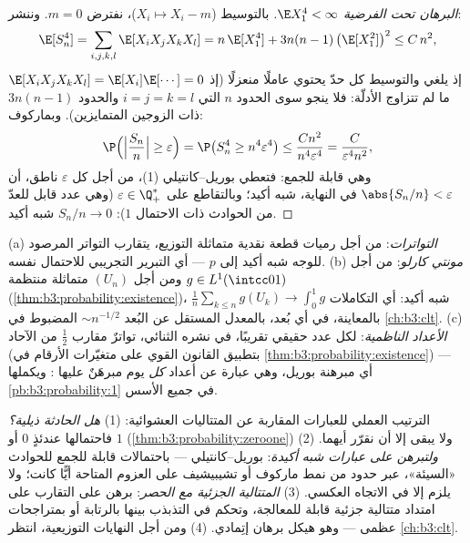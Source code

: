 \begin{proof}[البرهان تحت الفرضية $\E X_1^4 < \infty$]
بالتوسيط ($X_i \mapsto X_i - m$)، نفترض $m = 0$. وننشر:
\[
\E[S_n^4] = \sum_{i,j,k,l}\E[X_iX_jX_kX_l]
= n\,\E[X_1^4] + 3n(n-1)\,\bigl(\E[X_1^2]\bigr)^2 \leq
C\,n^2 ,
\]
إذ يلغي  والتوسيط كل حدّ يحتوي عاملًا منعزلًا (إذ
$\E[X_iX_jX_kX_l] =
\E[X_i]\E[\cdots] = 0$ ما لم تتزاوج الأدلّة: فلا ينجو سوى الحدود $n$ التي
$i=j=k=l$ والحدود $3n(n-1)$ ذات الزوجين المتمايزين). وبماركوف:
\[
\P\Bigl(\Bigl|\frac{S_n}n\Bigr| \geq \varepsilon\Bigr)
= \P\bigl(S_n^4 \geq n^4\varepsilon^4\bigr)
\leq \frac{Cn^2}{n^4\varepsilon^4} =
\frac{C}{\varepsilon^4n^2},
\]
وهي قابلة للجمع: فتعطي بوريل--كانتيلي (1)، من أجل كل
$\varepsilon$ ناطق، أن $\abs{S_n/n} < \varepsilon$ في النهاية، شبه أكيد؛ وبالتقاطع
على $\varepsilon \in \Q_+^*$ (وهي عدد قابل للعدّ من الحوادث ذات الاحتمال $1$):
$S_n/n \to 0$ شبه أكيد.
\end{proof}

\begin{example}
\label{ex:b3:probability:sllnapps}
(a) \emph{التواترات}: من أجل رميات قطعة نقدية  متماثلة
التوزيع، يتقارب التواتر المرصود للوجه شبه أكيد إلى $p$ --- أي
التبرير التجريبي للاحتمال نفسه.
(b) \emph{مونتي كارلو}: من أجل $g \in
L^1(\intcc01)$
ومن أجل $(U_n)$  متماثلة منتظمة (\cref{thm:b3:probability:existence})، $\frac1n\sum_{k\leq n}g(U_k) \to \int_0^1g$
شبه أكيد: أي التكاملات بالمعاينة، في أي بُعد، بالمعدل المستقل
عن البُعد $\sim n^{-1/2}$ المضبوط في \cref{ch:b3:clt}.
(c) \emph{الأعداد الناظمية}: لكل عدد حقيقي تقريبًا، في نشره
الثنائي، تواترٌ مقارب $\frac12$ من الآحاد (بتطبيق القانون القوي
على متغيّرات الأرقام في \cref{thm:b3:probability:existence}) --- أي مبرهنة بوريل، وهي
عبارة عن أعداد \emph{كل} يوم مبرهَنٌ عليها : ويكملها
\cref{pb:b3:probability:1} في جميع الأسس.
\end{example}

\begin{method}\label{met:b3:probability:toolkit}
الترتيب العملي للعبارات المقاربة عن المتتاليات العشوائية:
(1) \emph{هل الحادثة ذيلية؟} فاحتمالها عندئذٍ $0$ أو $1$
(\cref{thm:b3:probability:zeroone}) ولا يبقى إلا أن نقرّر أيهما. (2) \emph{ولتبرهن
على عبارات شبه أكيدة}: بوريل--كانتيلي --- باحتمالات قابلة للجمع
للحوادث «السيئة»، عبر حدود من نمط ماركوف أو تشيبيشيف على
العزوم المتاحة أيًّا كانت؛ ولا يلزم  إلا في الاتجاه
العكسي. (3) \emph{المتتالية الجزئية مع الحصر}: برهن على التقارب
على امتداد متتالية جزئية قابلة للمعالجة، وتحكم في التذبذب
بينها بالرتابة أو بمتراجحات عظمى --- وهو هيكل برهان إتِمادي.
(4) ومن أجل النهايات التوزيعية، انتظر \cref{ch:b3:clt}.
\end{method}

